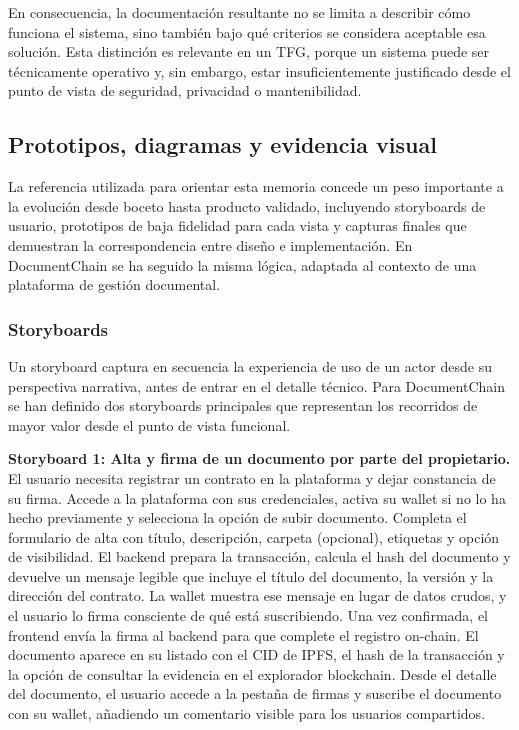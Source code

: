 \documentclass[11pt, a4paper]{article}
\begin{document}
En consecuencia, la documentación resultante no se limita a describir cómo funciona el sistema, sino también bajo qué criterios se considera aceptable esa solución. Esta distinción es relevante en un TFG, porque un sistema puede ser técnicamente operativo y, sin embargo, estar insuficientemente justificado desde el punto de vista de seguridad, privacidad o mantenibilidad.

\subsection{Prototipos, diagramas y evidencia visual}

La referencia utilizada para orientar esta memoria concede un peso importante a la evolución desde boceto hasta producto validado, incluyendo storyboards de usuario, prototipos de baja fidelidad para cada vista y capturas finales que demuestran la correspondencia entre diseño e implementación. En DocumentChain se ha seguido la misma lógica, adaptada al contexto de una plataforma de gestión documental.

\subsubsection{Storyboards}

Un storyboard captura en secuencia la experiencia de uso de un actor desde su perspectiva narrativa, antes de entrar en el detalle técnico. Para DocumentChain se han definido dos storyboards principales que representan los recorridos de mayor valor desde el punto de vista funcional.

\textbf{Storyboard 1: Alta y firma de un documento por parte del propietario.} El usuario necesita registrar un contrato en la plataforma y dejar constancia de su firma. Accede a la plataforma con sus credenciales, activa su wallet si no lo ha hecho previamente y selecciona la opción de subir documento. Completa el formulario de alta con título, descripción, carpeta (opcional), etiquetas y opción de visibilidad. El backend prepara la transacción, calcula el hash del documento y devuelve un mensaje legible que incluye el título del documento, la versión y la dirección del contrato. La wallet muestra ese mensaje en lugar de datos crudos, y el usuario lo firma consciente de qué está suscribiendo. Una vez confirmada, el frontend envía la firma al backend para que complete el registro on-chain. El documento aparece en su listado con el CID de IPFS, el hash de la transacción y la opción de consultar la evidencia en el explorador blockchain. Desde el detalle del documento, el usuario accede a la pestaña de firmas y suscribe el documento con su wallet, añadiendo un comentario visible para los usuarios compartidos.
\end{document}
